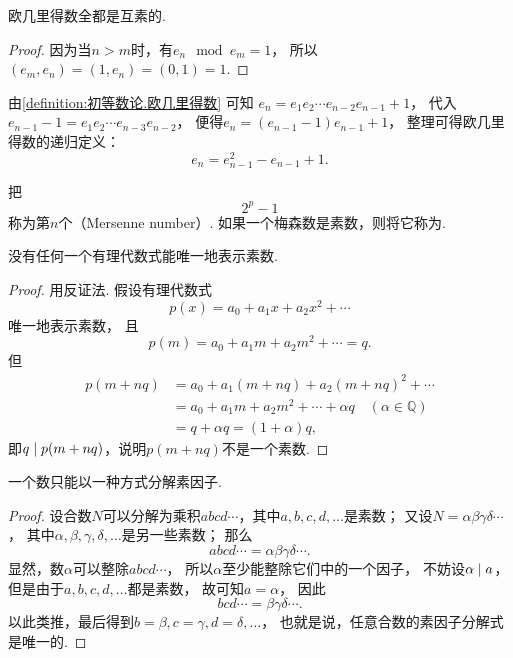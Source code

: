\begin{proposition}
欧几里得数全都是互素的.
\begin{proof}
因为当\(n > m\)时，有\(e_n \mod e_m = 1\)，
所以\((e_m,e_n)
= (1,e_n)
= (0,1)
= 1\).
\end{proof}
\end{proposition}

由\cref{definition:初等数论.欧几里得数} 可知
\(e_n = e_1 e_2 \dotsm e_{n-2} e_{n-1} + 1\)，
代入\(e_{n-1} - 1 = e_1 e_2 \dotsm e_{n-3} e_{n-2}\)，
便得\(e_n = (e_{n-1} - 1) e_{n-1} + 1\)，
整理可得欧几里得数的递归定义：\begin{equation}
	e_n = e_{n-1}^2 - e_{n-1} + 1.
\end{equation}

\begin{definition}
把\[
	2^p - 1
\]称为第\(n\)个（Mersenne number）.
如果一个梅森数是素数，则将它称为.
\end{definition}

\begin{theorem}
没有任何一个有理代数式能唯一地表示素数.
\begin{proof}
用反证法.
假设有理代数式\[
	p(x) = a_0 + a_1 x + a_2 x^2 + \dotsb
\]唯一地表示素数，
且\[
	p(m) = a_0 + a_1 m + a_2 m^2 + \dotsb = q.
\]
但\begin{align*}
	p(m+nq) &= a_0 + a_1 (m+nq) + a_2 (m+nq)^2 + \dotsb \\
	&= a_0 + a_1 m + a_2 m^2 + \dotsb + \alpha q \quad(\alpha\in\mathbb{Q}) \\
	&= q + \alpha q = (1+\alpha)q,
\end{align*}
即\(\truediv{p(m+nq)}{q}\)，说明\(p(m+nq)\)不是一个素数.
\end{proof}
\end{theorem}

\begin{theorem}[算数基本定理]
一个数只能以一种方式分解素因子.
\begin{proof}
设合数\(N\)可以分解为乘积\(abcd\dotsm\)，其中\(a,b,c,d,\dotsc\)是素数；
又设\(N = \alpha\beta\gamma\delta\dotsm\)，
其中\(\alpha,\beta,\gamma,\delta,\dotsc\)是另一些素数；
那么\[
	abcd\dotsm = \alpha\beta\gamma\delta\dotsm.
\]
显然，数\(\alpha\)可以整除\(abcd\dotsm\)，
所以\(\alpha\)至少能整除它们中的一个因子，
不妨设\(\truediv{a}{\alpha}\)，
但是由于\(a,b,c,d,\dotsc\)都是素数，
故可知\(a=\alpha\)，
因此\[
	bcd\dotsm = \beta\gamma\delta\dotsm.
\]
以此类推，最后得到\(b=\beta,c=\gamma,d=\delta,\dotsc\)，
也就是说，任意合数的素因子分解式是唯一的.
\end{proof}
\end{theorem}

